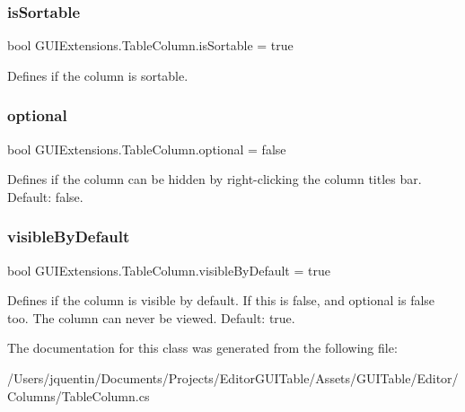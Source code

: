 \subsubsection{\texorpdfstring{is\+Sortable}{isSortable}}
{\footnotesize\ttfamily bool G\+U\+I\+Extensions.\+Table\+Column.\+is\+Sortable = true}



Defines if the column is sortable. 

\mbox{\label{class_g_u_i_extensions_1_1_table_column_ac09648f6d91b018cae5c80bcd7499630}} 
\subsubsection{\texorpdfstring{optional}{optional}}
{\footnotesize\ttfamily bool G\+U\+I\+Extensions.\+Table\+Column.\+optional = false}



Defines if the column can be hidden by right-\/clicking the column titles bar. Default\+: false. 

\mbox{\label{class_g_u_i_extensions_1_1_table_column_af0cd04c373e963e227a4bfb4da234f77}} 
\subsubsection{\texorpdfstring{visible\+By\+Default}{visibleByDefault}}
{\footnotesize\ttfamily bool G\+U\+I\+Extensions.\+Table\+Column.\+visible\+By\+Default = true}



Defines if the column is visible by default. If this is false, and optional is false too. The column can never be viewed. Default\+: true. 



The documentation for this class was generated from the following file\+:\begin{DoxyCompactItemize}
\item 
/\+Users/jquentin/\+Documents/\+Projects/\+Editor\+G\+U\+I\+Table/\+Assets/\+G\+U\+I\+Table/\+Editor/\+Columns/Table\+Column.\+cs\end{DoxyCompactItemize}
